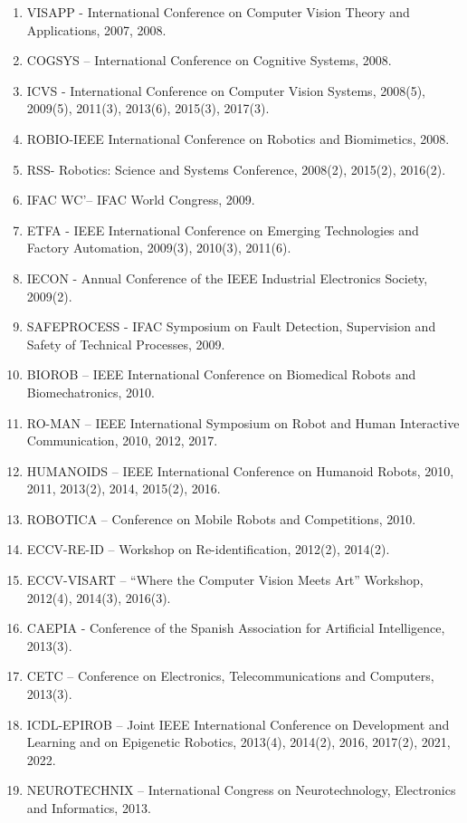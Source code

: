 \begin{enumerate}
  2007.
\item
  VISAPP - International Conference on Computer Vision Theory and
  Applications, 2007, 2008.
\item
  COGSYS -- International Conference on Cognitive Systems, 2008.
\item
  ICVS - International Conference on Computer Vision Systems, 2008(5),
  2009(5), 2011(3), 2013(6), 2015(3), 2017(3).
\item
  ROBIO-IEEE International Conference on Robotics and Biomimetics, 2008.
\item
  RSS- Robotics: Science and Systems Conference, 2008(2), 2015(2),
  2016(2).
\item
  IFAC WC'-- IFAC World Congress, 2009.
\item
  ETFA - IEEE International Conference on Emerging Technologies and
  Factory Automation, 2009(3), 2010(3), 2011(6).
\item
  IECON - Annual Conference of the IEEE Industrial Electronics Society,
  2009(2).
\item
  SAFEPROCESS - IFAC Symposium on Fault Detection, Supervision and
  Safety of Technical Processes, 2009.
\item
  BIOROB -- IEEE International Conference on Biomedical Robots and
  Biomechatronics, 2010.
\item
  RO-MAN -- IEEE International Symposium on Robot and Human Interactive
  Communication, 2010, 2012, 2017.
\item
  HUMANOIDS -- IEEE International Conference on Humanoid Robots, 2010,
  2011, 2013(2), 2014, 2015(2), 2016.
\item
  ROBOTICA -- Conference on Mobile Robots and Competitions, 2010.
\item
  ECCV-RE-ID -- Workshop on Re-identification, 2012(2), 2014(2).
\item
  ECCV-VISART -- ``Where the Computer Vision Meets Art'' Workshop,
  2012(4), 2014(3), 2016(3).
\item
  CAEPIA - Conference of the Spanish Association for Artificial
  Intelligence, 2013(3).
\item
  CETC -- Conference on Electronics, Telecommunications and Computers,
  2013(3).
\item
  ICDL-EPIROB -- Joint IEEE International Conference on Development and
  Learning and on Epigenetic Robotics, 2013(4), 2014(2), 2016, 2017(2),
  2021, 2022.
\item
  NEUROTECHNIX -- International Congress on Neurotechnology, Electronics
  and Informatics, 2013.

\end{enumerate}
